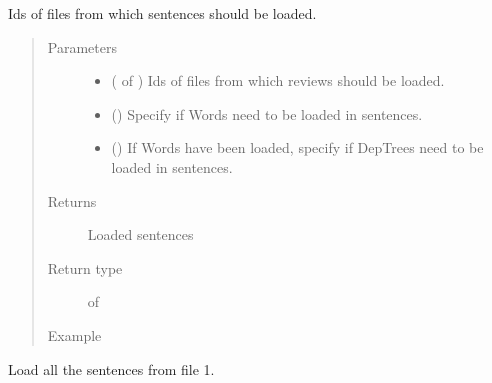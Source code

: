 \documentclass[letterpaper,10pt,english]{sphinxmanual}
\begin{document}
\begin{fulllineitems}
\label{\detokenize{load:loacore.load.sentence_load.load_sentences_by_id_files}}
Ids of files from which sentences should be loaded.
\begin{quote}\begin{description}
\item[{Parameters}] \leavevmode\begin{itemize}
\item {} 
 ( of ) \textendash{} Ids of files from which reviews should be loaded.

\item {} 
 () \textendash{} Specify if Words need to be loaded in sentences.

\item {} 
 () \textendash{} If Words have been loaded, specify if DepTrees need to be loaded in sentences.

\end{itemize}

\item[{Returns}] \leavevmode
Loaded sentences

\item[{Return type}] \leavevmode
{} of {\hyperref[\detokenize{classes:loacore.classes.classes.Sentence}]{}}

\item[{Example}] \leavevmode
\end{description}\end{quote}

Load all the sentences from file 1.

%
\begin{sphinxVerbatim}[commandchars=\\\{\}]
   
  \PYG{p}{[}\PYG{p}{]}
\PYG{p}{[}\PYG{p}{]}
\end{sphinxVerbatim}

\end{fulllineitems}
\end{document}
